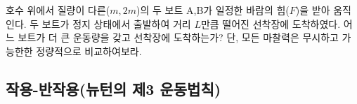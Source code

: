 \begin{task}
    
  \begin{flushleft}
      호수 위에서 질량이 다른($m, 2m$)의 두 보트 A,B가 일정한 바람의 힘($F$)을 받아 움직인다. 
      두 보트가 정지 상태에서 출발하여 
      거리 $L$만큼 떨어진 선착장에 도착하였다. 어느 보트가 더 큰 운동량을 갖고 선착장에 도착하는가? 단, 모든 마찰력은 무시하고 가능한한
      정량적으로 비교하여보라.
 \end{flushleft}
\end{task}

   
\subsection{작용-반작용(뉴턴의 제3 운동법칙)}

